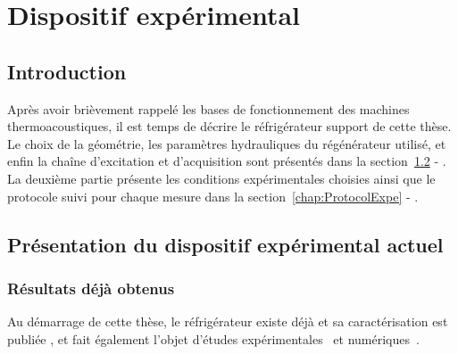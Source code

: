 \chapter{Dispositif expérimental}\label{chap:DispositifExpe}
\mylocaltoc

%    

\newpage

%

\section{Introduction}\label{chap:IntroProtocExp}
Après avoir brièvement rappelé les bases de fonctionnement des machines thermoacoustiques, il est temps de décrire le réfrigérateur support de cette thèse. Le choix de la géométrie, les paramètres hydrauliques du régénérateur utilisé, et enfin la chaîne d'excitation et d'acquisition sont présentés dans la section~\ref{chap:PresentationTacot} - . La deuxième partie présente les conditions expérimentales choisies ainsi que le protocole suivi pour chaque mesure dans la section~\ref{chap:ProtocolExpe} - .


\section{Présentation du dispositif expérimental actuel}\label{chap:PresentationTacot}

\subsection{Résultats déjà obtenus}\label{chap:PresTacot_ResultatsATE}
 Au démarrage de cette thèse, le réfrigérateur existe déjà et sa caractérisation est publiée \cite{ramadan_design_2021}, et fait également l'objet d'études expérimentales~\cite{ramadan_experimental_2018, ramadan_experimental_2021} et  numériques~\cite{hireche_numerical_2019, hireche_experimental_2020, baltean_gravity_2025}. 

